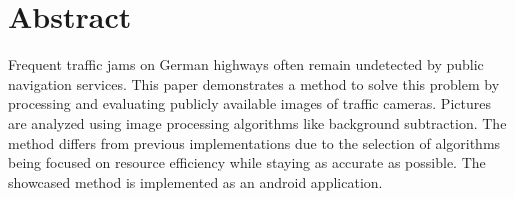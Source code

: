 \chapter*{Abstract} %
Frequent traffic jams on German highways often remain undetected by public navigation services. This paper demonstrates a method to solve this problem by processing and evaluating publicly available images of traffic cameras.
Pictures are analyzed using image processing algorithms like background subtraction. The method differs from previous implementations due to the selection of algorithms being focused on resource efficiency while staying as accurate as possible.
The showcased method is implemented as an android application.

